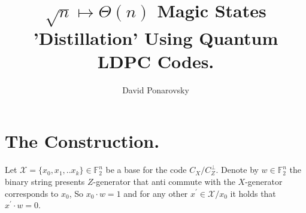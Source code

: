 \documentclass[manuscript,screen,review]{acmart}
\begin{document}

\title{ $\sqrt{n} \mapsto \Theta(n)$  Magic States 'Distillation' Using
Quantum LDPC Codes. }
\author{David Ponarovsky}
\maketitle





\section{The Construction.} 


Let $\mathcal{X} = \{x_{0}, x_{1}, .. x_{k}\} \in \mathbb{F}_{2}^{n}$ be a base for the code $C_{X}/C_{Z}^\perp$.  Denote by $w \in \mathbb{F}_{2}^{n}$ the binary string presents $Z$-generator that anti commute with the $X$-generator corresponds to $x_{0}$, So $x_{0}\cdot w = 1$ and for any other  $x^\prime \in \mathcal{X}/x_{0}$ it holds that $x^{\prime}\cdot w = 0 $.


 



\printbibliography
\end{document}
